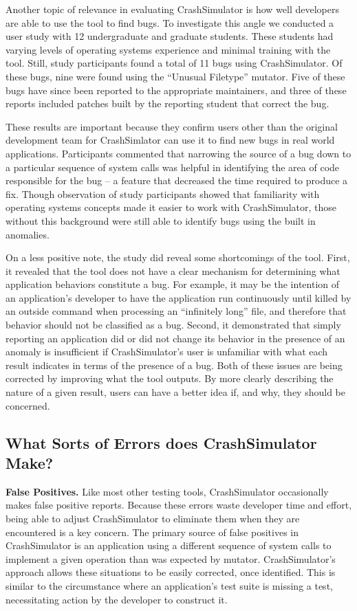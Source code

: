 Another topic of relevance
in evaluating CrashSimulator
is how well developers are able to use the tool
to find bugs.
To investigate this angle
we conducted a user study
with 12 undergraduate and graduate students.
These students had varying levels
of operating systems experience
and minimal training with the tool.
Still, study participants found a total of 11 bugs using CrashSimulator.
Of these bugs, nine were found using the ``Unusual Filetype'' mutator.
Five of these bugs have since been reported to the appropriate maintainers,
and three of these reports included patches built by the reporting student
that correct the bug.

These results are important
because they confirm
users other than the original development team
for CrashSimlator
can use it to find new bugs in real world applications.
Participants commented that narrowing the source of a bug
down to a particular sequence of system calls
was helpful in identifying the area of
code responsible for the bug -- a feature
that decreased the time required to produce a fix.
Though observation of study participants
showed that familiarity with operating systems concepts
made it easier to work with CrashSimulator,
those without this background were still able to identify bugs using the
built in anomalies.


On a less positive note,
the study did reveal
some shortcomings
of the tool.
First,
it revealed that the tool
does not have a clear mechanism
for determining
what application behaviors constitute a bug.
For example,
it may be the intention of an application's developer
to have the application run continuously
until killed by an outside command
when processing an ``infinitely long'' file,
and therefore that behavior should not be classified as a bug.
Second,
it demonstrated that
simply reporting an application did or did not change its behavior
in the presence of an anomaly is insufficient
if CrashSimulator's user is unfamiliar
with what each result indicates in terms of the presence of a bug.
Both of these issues are being corrected
by improving what the tool outputs.
By more clearly describing
the nature of a given result,
users can have a better idea
if,
and why,
they should be concerned.


\subsection{What Sorts of Errors does CrashSimulator Make?}
\label{sec-sorts-errors}

\textbf{False Positives.}
Like most other testing tools, CrashSimulator occasionally makes
false positive reports.
Because these errors waste developer time and effort,
being able to adjust CrashSimulator to eliminate them when they are
encountered is a key concern.
The primary source of false positives in CrashSimulator is an application
using a different sequence of system calls to implement a given operation
than was expected by mutator.
CrashSimulator's approach allows these
situations to be easily corrected, once identified.
This is similar to the circumstance where an
application's test suite is missing a test, necessitating action by the
developer to construct it.

